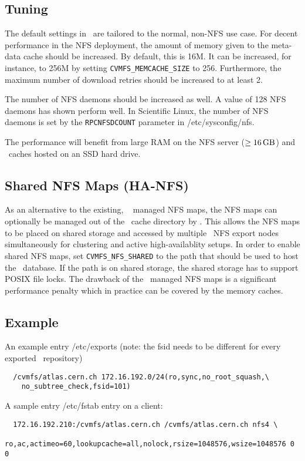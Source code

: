 \subsection{Tuning}
The default settings in \cvmfs\ are tailored to the normal, non-NFS use case.
For decent performance in the NFS deployment, the amount of memory given to the meta-data cache should be increased. 
By default, this is 16M.
It can be increased, for instance, to 256M by setting \texttt{CVMFS\_MEMCACHE\_SIZE} to 256.
Furthermore, the maximum number of download retries should be increased to at least 2.

The number of NFS daemons should be increased as well.
A value of 128 NFS daemons has shown perform well.
In Scientific Linux, the number of NFS daemons is set by the \texttt{RPCNFSDCOUNT} parameter in /etc/sysconfig/nfs.

The performance will benefit from large RAM on the NFS server ($\geq\SI{16}{\giga\byte}$) and \cvmfs\ caches hosted on an SSD hard drive.

\subsection{Shared NFS Maps (HA-NFS)}
As an alternative to the existing, \leveldb~\cite{leveldb} managed NFS maps, the NFS maps can optionally be managed out of the \cvmfs\ cache directory by \sqlite.
This allows the NFS maps to be placed on shared storage and accessed by multiple \cvmfs\ NFS export nodes simultaneously for clustering and active high-availablity setups.
In order to enable shared NFS maps, set \texttt{CVMFS\_NFS\_SHARED} to the path that should be used to host the \sqlite\ database.  
If the path is on shared storage, the shared storage has to support POSIX file locks.
The drawback of the \sqlite\ managed NFS maps is a significant performance penalty which in practice can be covered by the memory caches.

\subsection{Example}
An example entry /etc/exports (note: the fsid needs to be different for every exported \cvmfs\ repository)
\begin{verbatim}
  /cvmfs/atlas.cern.ch 172.16.192.0/24(ro,sync,no_root_squash,\
    no_subtree_check,fsid=101)
\end{verbatim}
A sample entry /etc/fstab entry on a client:
\begin{verbatim}
  172.16.192.210:/cvmfs/atlas.cern.ch /cvmfs/atlas.cern.ch nfs4 \
    ro,ac,actimeo=60,lookupcache=all,nolock,rsize=1048576,wsize=1048576 0 0
\end{verbatim}


